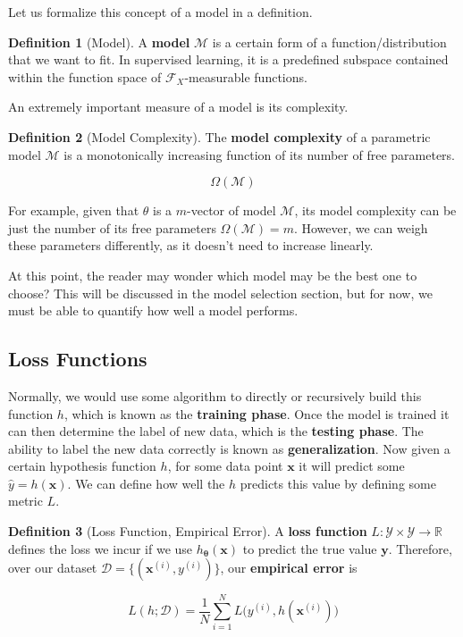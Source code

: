 \documentclass{article}
\theoremstyle{definition}
\newtheorem{definition}{Definition}[section]
\begin{document}
    Let us formalize this concept of a model in a definition. 

    \begin{definition}[Model]
      A \textbf{model} $\mathcal{M}$ is a certain form of a function/distribution that we want to fit. In supervised learning, it is a predefined subspace contained within the function space of $\mathcal{F}_X$-measurable functions. 
    \end{definition}

    An extremely important measure of a model is its complexity. 

    \begin{definition}[Model Complexity]
      The \textbf{model complexity} of a parametric model $\mathcal{M}$ is a monotonically increasing function of its number of free parameters. 

        \[\Omega(\mathcal{M})\]

      For example, given that $\theta$ is a $m$-vector of model $\mathcal{M}$, its model complexity can be just the number of its free parameters $\Omega(\mathcal{M}) = m$. However, we can weigh these parameters differently, as it doesn't need to increase linearly. 
    \end{definition}

    At this point, the reader may wonder which model may be the best one to choose? This will be discussed in the model selection section, but for now, we must be able to quantify how well a model performs. 

  \subsection{Loss Functions}

    Normally, we would use some algorithm to directly or recursively build this function $h$, which is known as the \textbf{training phase}. Once the model is trained it can then determine the label of new data, which is the \textbf{testing phase}. The ability to label the new data correctly is known as \textbf{generalization}. Now given a certain hypothesis function $h$, for some data point $\mathbf{x}$ it will predict some $\hat{y} = h(\mathbf{x})$. We can define how well the $h$ predicts this value by defining some metric $L$. 

    \begin{definition}[Loss Function, Empirical Error]
      A \textbf{loss function} $L: \mathcal{Y} \times \mathcal{Y} \rightarrow \mathbb{R}$ defines the loss we incur if we use $h_{\boldsymbol{\theta}} (\mathbf{x})$ to predict the true value $\mathbf{y}$. Therefore, over our dataset $\mathcal{D} = \{(\mathbf{x}^{(i)}, y^{(i)})\}$, our \textbf{empirical error} is 

        \[L(h; \mathcal{D}) = \frac{1}{N} \sum_{i=1}^N L\big( y^{(i)}, h(\mathbf{x}^{(i)}) \big)\]
    \end{definition}
\end{document}
